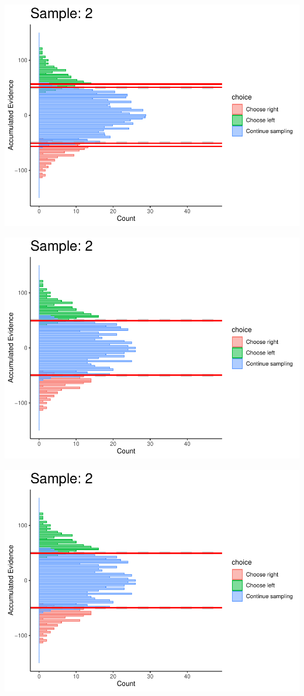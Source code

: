 \documentclass[
]{book}
\begin{document}
\begin{center}\includegraphics[width=0.8\linewidth]{LateNightBayes_files/figure-latex/fixed_dcb-10} \end{center}

\begin{center}\includegraphics[width=0.8\linewidth]{LateNightBayes_files/figure-latex/fixed_dcb-11} \end{center}

\begin{center}\includegraphics[width=0.8\linewidth]{LateNightBayes_files/figure-latex/fixed_dcb-12} \end{center}
\end{document}
